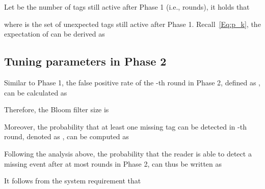 \documentclass[10pt, twocolumn]{IEEEtran}
\begin{document}
Let  be the number of tags still active after Phase 1 (i.e.,  rounds), it holds that

where  is the set of unexpected tags still active after Phase 1.
Recall~\eqref{Eq:p_k}, the expectation of  can be derived as


\subsection{Tuning parameters in Phase 2}

Similar to Phase 1, the false positive rate of the -th round in Phase 2, defined as , can be calculated as

Therefore, the Bloom filter size is


Moreover, the probability that at least one missing tag can be detected in -th round, denoted as , can be computed as


\begin{comment}
Similarly,  reaches the minimum value when  given , i.e.,




In addition,  the probability that at least one of the missing tags can be detected in -th round, denoted as , can be computed as

\end{comment}

Following the analysis above, the probability  that the reader is able to detect a missing event after at most  rounds in Phase 2, can thus be written as


\begin{comment}
Since , it can be checked that the detection probability  is monotonically increasing and  is monotonically decreasing with respect to the number of missing tags , meaning that  makes the detection hardest and any greater  will ease the hardness. It is thus reasonable to use  in the rest of the analysis, because if the reader can detect a missing tag event with probability  when , it will fulfill the detection with probability  when .

Let  for the case that , thus we have


To guarantee the system requirement on the detection probability, the detection probability should be at least equal to  in the worst case, we thus let

and have

\end{comment}

It follows from the system requirement that
\end{document}
